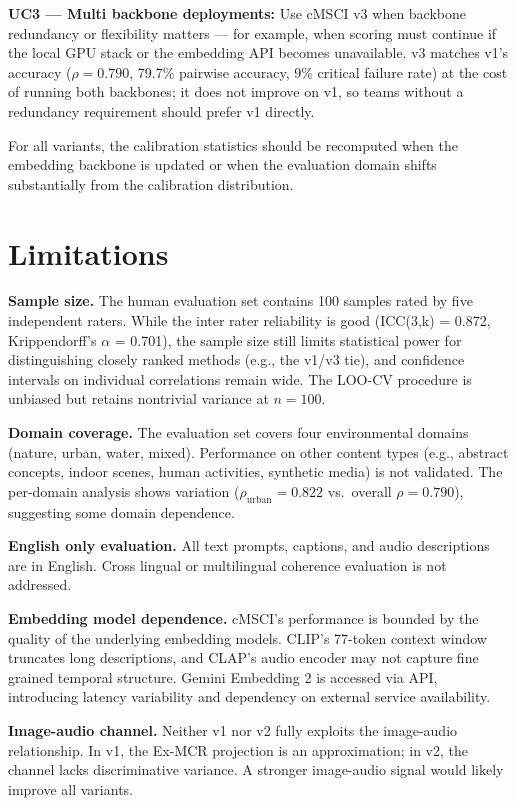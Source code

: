\documentclass[a4paper,fleqn]{cas-sc}
\begin{document}
\begin{itemize}
\textbf{UC3 --- Multi backbone deployments:} Use cMSCI v3 when backbone redundancy or flexibility matters — for example, when scoring must continue if the local GPU stack or the embedding API becomes unavailable. v3 matches v1's accuracy ($\rho = 0.790$, 79.7\% pairwise accuracy, 9\% critical failure rate) at the cost of running both backbones; it does not improve on v1, so teams without a redundancy requirement should prefer v1 directly.

For all variants, the calibration statistics should be recomputed when the embedding backbone is updated or when the evaluation domain shifts substantially from the calibration distribution.

\section{Limitations}\label{sec:limitations}

\textbf{Sample size.} The human evaluation set contains 100 samples rated by five independent raters. While the inter rater reliability is good (ICC(3,k) = 0.872, Krippendorff's $\alpha$ = 0.701), the sample size still limits statistical power for distinguishing closely ranked methods (e.g., the v1/v3 tie), and confidence intervals on individual correlations remain wide. The LOO-CV procedure is unbiased but retains nontrivial variance at $n = 100$.

\textbf{Domain coverage.} The evaluation set covers four environmental domains (nature, urban, water, mixed). Performance on other content types (e.g., abstract concepts, indoor scenes, human activities, synthetic media) is not validated. The per-domain analysis shows variation ($\rho_{\mathrm{urban}} = 0.822$ vs.\ overall $\rho = 0.790$), suggesting some domain dependence.

\textbf{English only evaluation.} All text prompts, captions, and audio descriptions are in English. Cross lingual or multilingual coherence evaluation is not addressed.

\textbf{Embedding model dependence.} cMSCI's performance is bounded by the quality of the underlying embedding models. CLIP's 77-token context window truncates long descriptions, and CLAP's audio encoder may not capture fine grained temporal structure. Gemini Embedding 2 is accessed via API, introducing latency variability and dependency on external service availability.

\textbf{Image-audio channel.} Neither v1 nor v2 fully exploits the image-audio relationship. In v1, the Ex-MCR projection is an approximation; in v2, the channel lacks discriminative variance. A stronger image-audio signal would likely improve all variants.


\end{itemize}
\end{document}
